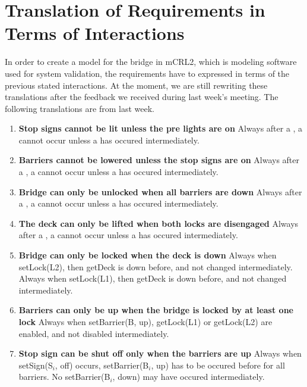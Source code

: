 \section{Translation of Requirements in Terms of Interactions}

In order to create a model for the bridge in mCRL2, which is modeling software used for system validation, the requirements have to expressed in terms of the previous stated interactions. At the moment, we are still rewriting these translations after the feedback we received during last week's meeting. The following translations are from last week.

\begin{enumerate}
	\item \textbf{Stop signs cannot be lit unless the pre lights are on}
	Always after a , a  cannot occur unless a  has occured intermediately.

	\item \textbf{Barriers cannot be lowered unless the stop signs are on}
	Always after a , a  cannot occur unless a  has occured intermediately.

	\item \textbf{Bridge can only be unlocked when all barriers are down}
	Always after a , a  cannot occur unless a  has occured intermediately.

	\item	\textbf{The deck can only be lifted when both locks are disengaged}
	Always after a , a  cannot occur unless a  has occured intermediately.

	\item \textbf{Bridge can only be locked when the deck is down}
	Always when setLock(L2), then getDeck is down before, and not changed intermediately.
	Always when setLock(L1), then getDeck is down before, and not changed intermediately.

	\item \textbf{Barriers can only be up when the bridge is locked by at least one lock}
	Always when setBarrier(B, up), getLock(L1) or getLock(L2) are enabled, and not disabled intermediately.

	\item \textbf{Stop sign can be shut off only when the barriers are up}
	Always when setSign(S$_i$, off) occurs, setBarrier(B$_i$, up) has to be occured before for all barriers. No setBarrier(B$_i$, down) may have occured intermediately.


\end{enumerate}
